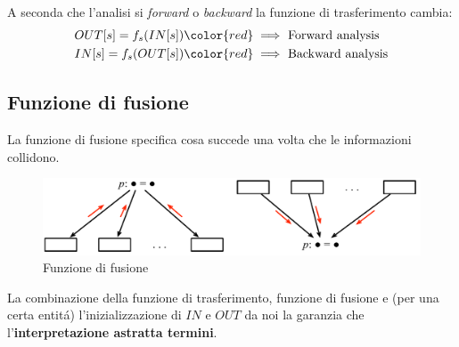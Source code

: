 A seconda che l'analisi si \textit{forward} o \textit{backward} la funzione di
trasferimento cambia:
\begin{align*}
& OUT[s] = f_s(IN[s]) {\color{red}\implies} \text{ Forward analysis} \\
& IN[s] = f_s(OUT[s]) {\color{red}\implies} \text{ Backward analysis}
\end{align*}

\subsection{Funzione di fusione}
\begin{definition}
La funzione di fusione specifica cosa succede una volta che le informazioni
collidono.
\end{definition}

\begin{figure}[H]
  \centering
  \includegraphics[scale=0.4]{res/image/merging_function}
  \caption{Funzione di fusione}
  \label{img:merging_function}
\end{figure}

La combinazione della funzione di trasferimento, funzione di fusione e (per
una certa entit\'a) l'inizializzazione di $IN$ e $OUT$ da noi la garanzia che
l'\textbf{interpretazione astratta termini}.
